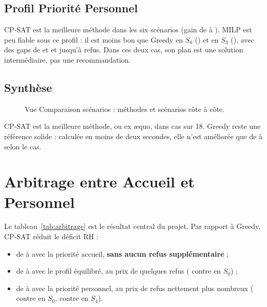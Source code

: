 \subsection{Profil Priorité Personnel}


CP-SAT est la meilleure méthode dans les six scénarios (gain de \GainMinPer{} à \GainMaxPer{}). MILP est peu fiable sous ce profil : il est moins bon que Greedy en $S_0$ (\MilpPerSz{}) et en $S_3$ (\MilpPerSt{}), avec des gaps de \GapMilpPerSz{} et \GapMilpPerSt{} et jusqu'à \RefusMilpPerSt{} refus. Dans ces deux cas, son plan est une solution intermédiaire, pas une recommandation.

\subsection{Synthèse}


\begin{figure}[H]
    \centering
    \caption{Vue Comparaison scénarios : méthodes et scénarios côte à côte.}
    \label{fig:comparaison}
\end{figure}

CP-SAT est la meilleure méthode, ou ex æquo, dans \NbCpMeilleur{} cas sur 18. Greedy reste une référence solide : calculée en moins de deux secondes, elle n'est améliorée que de \GainMinAcc{} à \GainMaxPer{} selon le cas.

\section{Arbitrage entre Accueil et Personnel}



Le tableau~\ref{tab:arbitrage} est le résultat central du projet. Par rapport à Greedy, CP-SAT réduit le déficit RH :
\begin{itemize}
    \item de \DeficitCpMinAcc{} à \DeficitCpMaxAcc{} avec la priorité accueil, \textbf{sans aucun refus supplémentaire} ;
    \item de \DeficitCpMinEq{} à \DeficitCpMaxEq{} avec le profil équilibré, au prix de quelques refus (\RefusCpEqSz{} contre \RefusSzGreedy{} en $S_0$) ;
    \item de \DeficitCpMinPer{} à \DeficitCpMaxPer{} avec la priorité personnel, au prix de refus nettement plus nombreux (\RefusCpPerSz{} contre \RefusSzGreedy{} en $S_0$, \RefusCpPerSq{} contre \RefusGreedySq{} en $S_4$).
\end{itemize}

